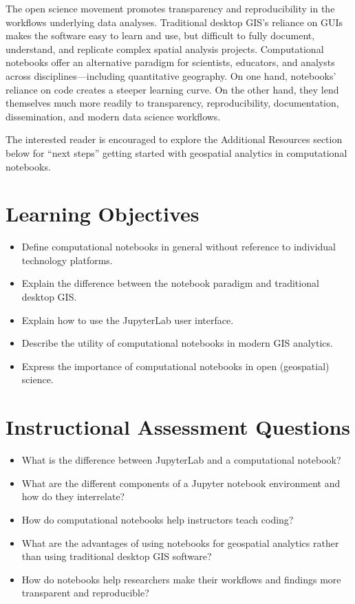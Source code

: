 \documentclass[11pt,letterpaper]{article}
\begin{document}
The open science movement promotes transparency and reproducibility in the workflows underlying data analyses. Traditional desktop GIS's reliance on GUIs makes the software easy to learn and use, but difficult to fully document, understand, and replicate complex spatial analysis projects. Computational notebooks offer an alternative paradigm for scientists, educators, and analysts across disciplines---including quantitative geography. On one hand, notebooks' reliance on code creates a steeper learning curve. On the other hand, they lend themselves much more readily to transparency, reproducibility, documentation, dissemination, and modern data science workflows.

The interested reader is encouraged to explore the Additional Resources section below for \enquote{next steps} getting started with geospatial analytics in computational notebooks.

\setlength{\bibsep}{0.00cm plus 0.05cm}



\section*{Learning Objectives}

\begin{itemize}
    \item Define computational notebooks in general without reference to individual technology platforms.
    \item Explain the difference between the notebook paradigm and traditional desktop GIS.
    \item Explain how to use the JupyterLab user interface.
    \item Describe the utility of computational notebooks in modern GIS analytics.
    \item Express the importance of computational notebooks in open (geospatial) science.
\end{itemize}

\section*{Instructional Assessment Questions}

\begin{itemize}
    \item What is the difference between JupyterLab and a computational notebook?
    \item What are the different components of a Jupyter notebook environment and how do they interrelate?
    \item How do computational notebooks help instructors teach coding?
    \item What are the advantages of using notebooks for geospatial analytics rather than using traditional desktop GIS software?
    \item How do notebooks help researchers make their workflows and findings more transparent and reproducible?
\end{itemize}
\end{document}
